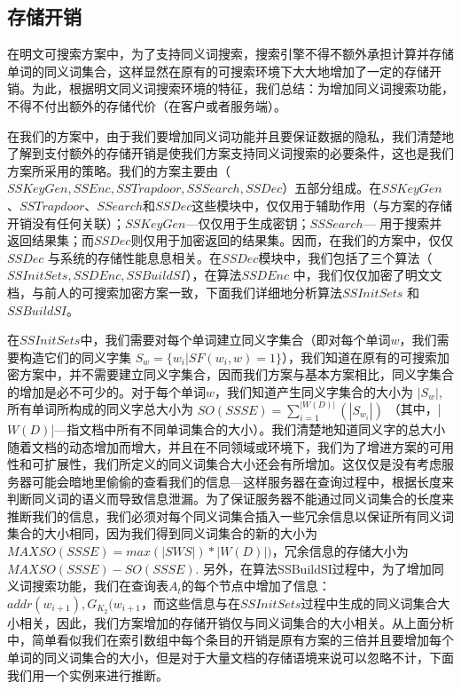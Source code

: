 \subsection{存储开销}
\label{sec:synonym_capability_sotorage}

在明文可搜索方案中，为了支持同义词搜索，搜索引擎不得不额外承担计算并存储单词的同义词集合，这样显然在原有的可搜索环境下大大地增加了一定的存储开销。为此，根据明文同义词搜索环境的特征，我们总结：为增加同义词搜索功能，不得不付出额外的存储代价（在客户或者服务端）。


在我们的方案中，由于我们要增加同义词功能并且要保证数据的隐私，我们清楚地了解到支付额外的存储开销是使我们方案支持同义词搜索的必要条件，这也是我们方案所采用的策略。我们的方案主要由（$SSKeyGen, SSEnc, SSTrapdoor, SSSearch, SSDec$）五部分组成。在$SSKeyGen$、$SSTrapdoor$、$SSearch$和$SSDec$这些模块中，仅仅用于辅助作用（与方案的存储开销没有任何关联）；$SSKeyGen$---仅仅用于生成密钥；$SSSearch$--- 用于搜索并返回结果集；而$SSDec$则仅用于加密返回的结果集。因而，在我们的方案中，仅仅$SSDec$ 与系统的存储性能息息相关。在$SSDec$模块中，我们包括了三个算法（$SSInitSets, SSDEnc, SSBuildSI$），在算法$SSDEnc$ 中，我们仅仅加密了明文文档，与前人的可搜索加密方案一致，下面我们详细地分析算法$SSInitSets$ 和$SSBuildSI$。

在$SSInitSets$中，我们需要对每个单词建立同义字集合（即对每个单词$w$，我们需要构造它们的同义字集 $S_w = \{ w_i | SF(w_i, w) = 1 \} $），我们知道在原有的可搜索加密方案中，并不需要建立同义字集合，因而我们方案与基本方案相比，同义字集合的增加是必不可少的。对于每个单词$w$，我们知道产生同义字集合的大小为 $|S_w|$, 所有单词所构成的同义字总大小为 $ SO(SSSE) = \sum_{i=1}^{|W(D)|} (|S_{w_i}|) $ （其中，|$W(D)$|---指文档中所有不同单词集合的大小）。我们清楚地知道同义字的总大小随着文档的动态增加而增大，并且在不同领域或环境下，我们为了增进方案的可用性和可扩展性，我们所定义的同义词集合大小还会有所增加。这仅仅是没有考虑服务器可能会暗地里偷偷的查看我们的信息---这样服务器在查询过程中，根据长度来判断同义词的语义而导致信息泄漏。为了保证服务器不能通过同义词集合的长度来推断我们的信息，我们必须对每个同义词集合插入一些冗余信息以保证所有同义词集合的大小相同，因为我们得到同义词集合的新的大小为 $ MAXSO(SSSE) = max(|SWS|) * |W(D)| ) $，冗余信息的存储大小为 $MAXSO(SSSE) - SO(SSSE)$. 另外，在算法SSBuildSI过程中，为了增加同义词搜索功能，我们在查询表$A_t$的每个节点中增加了信息：$addr(w_{i+1}), G_{K_2}(w_{i+1}$，而这些信息与在$SSInitSets$过程中生成的同义词集合大小相关，因此，我们方案增加的存储开销仅与同义词集合的大小相关。从上面分析中，简单看似我们在索引数组中每个条目的开销是原有方案的三倍并且要增加每个单词的同义词集合的大小，但是对于大量文档的存储语境来说可以忽略不计，下面我们用一个实例来进行推断。

